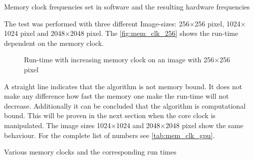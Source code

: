 \begin{table}[ht]
  \centering
	

 	\caption{Memory clock frequencies set in software and the resulting hardware frequencies}
 	\label{tab:mem_sw_hw}
\end{table}


The test was performed with three different Image-sizes: 256$\times$256 pixel, 
1024$\times$1024 pixel and 2048$\times$2048 pixel. The \autoref{fig:mem_clk_256}
shows the run-time dependent on the memory clock.

\begin{figure}[ht]
  \centering


  \tableA

 \caption{Run-time with increasing memory clock on an image with 256$\times$256 pixel}
 \label{fig:mem_clk_256}%
\end{figure}

A straight line indicates that the algorithm is not memory bound. It does not
make any difference how fast the memory one make the run-time will not decrease. 
Additionally it can be concluded that the algorithm is computational bound. This
will be proven in the next section when the core clock is manipulated. The image
sizes 1024$\times$1024 and 2048$\times$2048 pixel show the same behaviour. For 
the complete list of numbers see \autoref{tab:mem_clk_gpu}.


\begin{table}[ht]
	\centering
	

 	\caption{Various memory clocks and the corresponding run times}
 	\label{tab:mem_clk_gpu}
\end{table}



